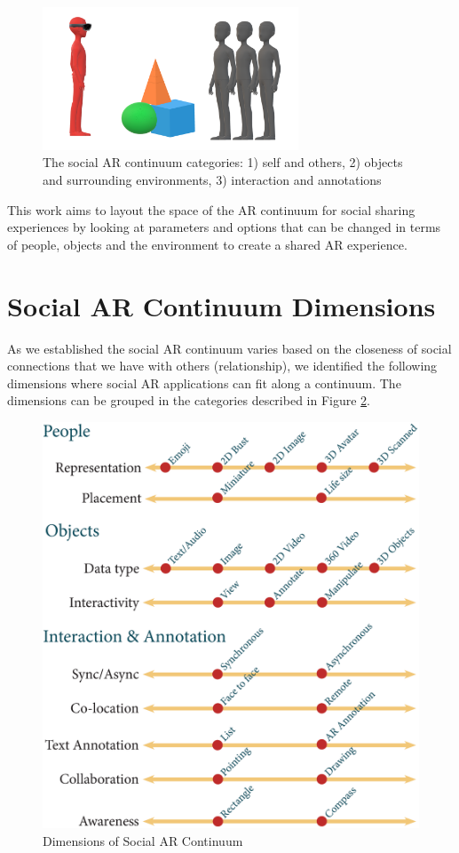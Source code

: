 \begin{figure}
    \centering
    \includegraphics[width=3in]{images/continuum_categories5.png}
    \caption{The social AR continuum categories: 1) self and others, 2) objects and surrounding environments, 3) interaction and annotations}
    \label{fig:continuum:categories}
\end{figure}


This work aims to layout the space of the AR continuum for social sharing experiences by looking at parameters and options that can be changed in terms of people, objects and the environment to create a shared AR experience.

\section{Social AR Continuum Dimensions}

As we established the social AR continuum varies based on the closeness of social connections that we have with others (relationship), we identified the following dimensions where social AR applications can fit along a continuum. The dimensions can be grouped in the categories described in Figure \ref{fig:continuum:dimensions}.

\begin{figure}
    \centering
    \includegraphics[width=.8\linewidth]{images/continuum4.1.eps}
    \caption{Dimensions of Social AR Continuum}
    \label{fig:continuum:dimensions}
\end{figure}


